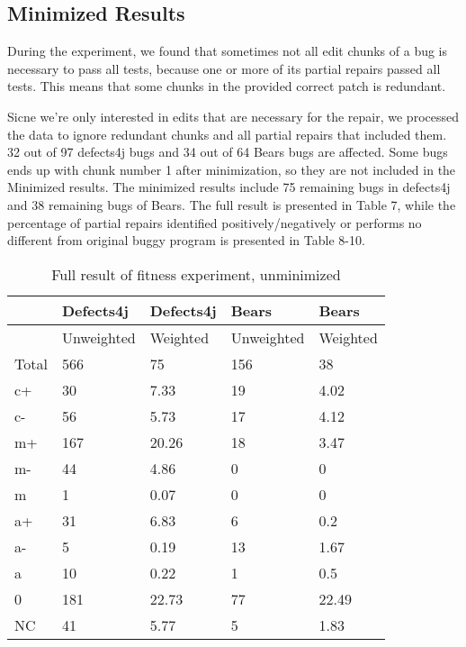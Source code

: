 \documentclass[sigconf, timestamp-false, anonymous=true]{acmart}
\begin{document}
    

\subsection{Minimized Results}

During the experiment, we found that sometimes not all edit chunks of a bug is necessary to pass all tests, because one or more of its partial repairs passed all tests. This means that some chunks in the provided correct patch is redundant. 

Sicne we're only interested in edits that are necessary for the repair, we processed the data to ignore redundant chunks and all partial repairs that included them. 32 out of 97 defects4j bugs and 34 out of 64 Bears bugs are affected. Some bugs ends up with chunk number 1 after minimization, so they are not included in the Minimized results. The minimized results include 75 remaining bugs in defects4j and 38 remaining bugs of Bears. The full result is presented in Table 7, while the percentage of partial repairs identified positively/negatively or performs no different from original buggy program is presented in Table 8-10.
\begin{table}

\begin{tabular}{| l | l | l | l | l |} \hline
    & Defects4j & Defects4j & Bears & Bears  \\ \hline
    & Unweighted & Weighted & Unweighted & Weighted \\ \hline
    Total & 566 & 75 & 156 & 38 \\ \hline
    c+ & 30 & 7.33 & 19 & 4.02 \\
    c- & 56 & 5.73 & 17 & 4.12 \\
    m+ & 167 & 20.26 & 18 & 3.47 \\
    m- & 44 & 4.86 & 0 & 0 \\
    m~ & 1 & 0.07 & 0 & 0 \\
    a+ & 31 & 6.83 & 6 & 0.2 \\
    a- & 5 & 0.19 & 13 & 1.67 \\
    a~ & 10 & 0.22 & 1 & 0.5 \\
    0 & 181 & 22.73 & 77 & 22.49 \\
    NC & 41 & 5.77 & 5 & 1.83 \\
    \hline
    
    
    \end{tabular}
    
\caption{Full result of fitness experiment, unminimized}
\end{table}
    
\end{document}
